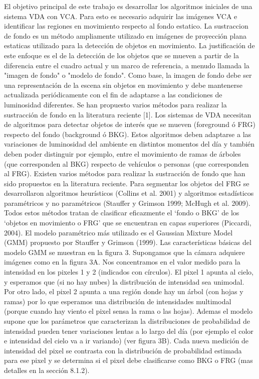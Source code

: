 \documentclass[12pt,a4paper]{article}
\begin{document}
El objetivo principal de este trabajo es desarrollar los algoritmos iniciales de una sistema VDA con VCA. Para esto es necesario adquirir las imágenes VCA e identificar las regiones en movimiento respecto al fondo estatico. La sustraccion de fondo es un método ampliamente utilizado en imágenes de proyección plana estaticas utilizado para la detección de objetos en movimiento. La justificación de este enfoque es el de la detección de los objetos que se mueven a partir de la diferencia entre el cuadro actual y un marco de referencia, a menudo llamada la "imagen de fondo" o "modelo de fondo". Como base, la imagen de fondo debe ser una representación de la escena sin objetos en movimiento y debe mantenerse actualizada periódicamente con el fin de adaptarse a las condiciones de luminosidad diferentes. Se han propuesto varios métodos para realizar la sustracción de fondo en la literatura reciente [1].
Los sistemas de VDA  necesitan de algoritmos para detectar objetos de interés que se mueven (foreground ó FRG) respecto del fondo (background ó BKG). Estos algoritmos deben adaptarse a las variaciones de luminosidad del ambiente en distintos momentos del día y también deben poder distinguir por ejemplo, entre el movimiento de ramas de árboles (que corresponden al BKG)  respecto de vehículos o personas (que corresponden al FRG). 
Existen varios métodos para realizar la sustracción de fondo que han sido propuestos en la literatura reciente. Para segmentar los objetos del FRG se desarrollaron algoritmos heurísticos (Collins et al. 2001) y algoritmos estadísticos paramétricos y no paramétricos (Stauffer y Grimson 1999; McHugh et al. 2009). Todos estos métodos tratan de clasificar eficazmente el ‘fondo o BKG’ de los ‘objetos en movimiento o FRG’ que se encuentran en capas superiores (Piccardi, 2004). El modelo paramétrico más utilizado es el Gaussian Mixture Model (GMM) propuesto por Stauffer y Grimson (1999). 
Las características básicas del modelo GMM se muestran en la figura 3. Supongamos que la cámara adquiere imágenes como en la figura 3A. Nos concentramos en el valor medido para la intensidad en los pixeles 1 y 2  (indicados con círculos). El pixel 1 apunta al cielo, y esperamos que (si no hay nubes)  la distribución de intensidad sea unimodal. Por otro lado, el pixel 2 apunta a una región donde hay un árbol (con hojas y ramas) por lo que esperamos una distribución de intensidades multimodal (porque cuando hay viento el pixel sensa la rama o las hojas). Ademas el modelo supone que  los parámetros que caracterizan la distribuciones de probabilidad de intensidad pueden tener variaciones lentas a lo largo del día (por ejemplo el color e intensidad del cielo va a ir variando) (ver figura 3B). Cada nueva medición de intensidad del pixel se contrasta con la distribución de probabilidad estimada para ese pixel y se determina si el pixel debe clasificarse como BKG o FRG (mas detalles en la sección 8.1.2).  
\end{document}
